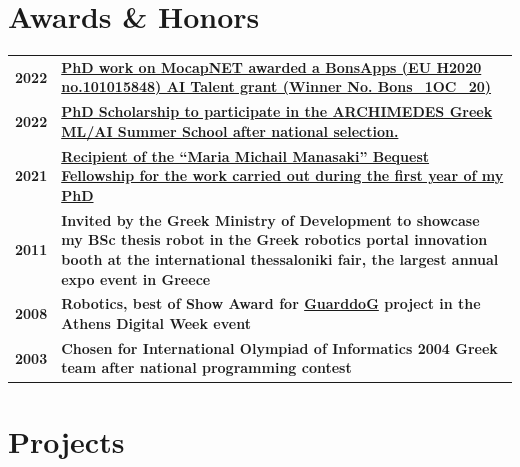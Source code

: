 \documentclass[a4,8pt]{article}
\newcommand{\hskills}[1]{
\textbf{\bfseries #1} }
\begin{document}
\section{Awards \& Honors}
\linespread{0.6}
\vspace{-0.2cm}
\begin{tabular}[t]{ p{4em} p{50em}}

\hskills{2022} & \hskills{\href{https://bonsapps-1oc-ai-talents.fundingbox.com/}{PhD work on MocapNET awarded a BonsApps (EU H2020 no.101015848) AI Talent grant (Winner No. Bons\_1OC\_20)}} \\
\hskills{2022} & \hskills{\href{https://www.athenarc.gr/en/news/archimedes-summer-program-2022}{ PhD Scholarship to participate in the ARCHIMEDES Greek ML/AI Summer School after national selection. }} \\
\hskills{2021} & \hskills{\href{https://www.csd.uoc.gr/CSD/index.jsp?custom=manasakis\&lang=en}{Recipient of the “Maria Michail Manasaki” Bequest Fellowship for the work carried out during the first year of my PhD }} \\

\hskills{2011} & \hskills{Invited by the Greek Ministry of Development to showcase my BSc thesis robot in the Greek robotics portal innovation booth at the international thessaloniki fair, the largest annual expo event in Greece} \\

\hskills{2008} & \hskills{Robotics, best of Show Award for \href{https://github.com/AmmarkoV/RoboVision/blob/master/Documentation/GuarDDoG_RoboVision.pdf}{GuarddoG} project in the Athens Digital Week event} \\

\hskills{2003} & \hskills{Chosen for International Olympiad of Informatics 2004 Greek team after national programming contest}  \\ %
\end{tabular} 
\linespread{0.2}

\linespread{0.82}
\section{Projects} %
\linespread{0.6}
\vspace{-0.1cm}
\end{document}
